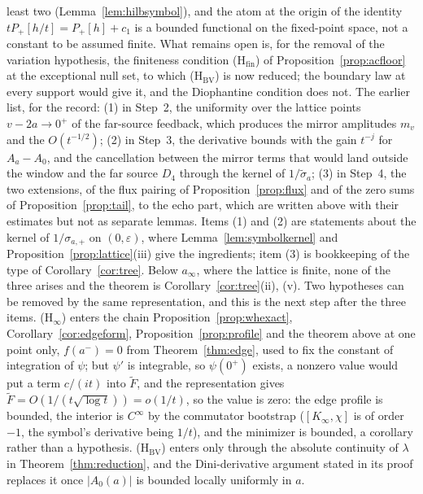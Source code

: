 \documentclass[11pt]{article}
\theoremstyle{definition}
\theoremstyle{remark}
\begin{document}
least two (Lemma~\ref{lem:hilbsymbol}), and the atom at the origin of the identity $tP_+[h/t]=P_+[h]+c_1$ is a bounded functional on the fixed-point space, not a constant to be assumed finite. What remains open is, for the removal of the variation hypothesis, the finiteness condition (H$_{\mathrm{fin}}$) of Proposition~\ref{prop:acfloor} at the exceptional null set, to which (H$_{\mathrm{BV}}$) is now reduced; the boundary law at every support would give it, and the Diophantine condition does not. The earlier list, for the record: (1) in Step~2, the uniformity over the lattice points $v-2a\to0^+$ of the far-source feedback, which produces the mirror amplitudes $m_v$ and the $O(t^{-1/2})$; (2) in Step~3, the derivative bounds with the gain $t^{-j}$ for $A_a-A_0$, and the cancellation between the mirror terms that would land outside the window and the far source $D_4$ through the kernel of $1/\tilde\sigma_a$; (3) in Step~4, the two extensions, of the flux pairing of Proposition~\ref{prop:flux} and of the zero sums of Proposition~\ref{prop:tail}, to the echo part, which are written above with their estimates but not as separate lemmas. Items (1) and (2) are statements about the kernel of $1/\sigma_{a,+}$ on $(0,\varepsilon)$, where Lemma~\ref{lem:symbolkernel} and Proposition~\ref{prop:lattice}(iii) give the ingredients; item (3) is bookkeeping of the type of Corollary~\ref{cor:tree}. Below $a_\infty$, where the lattice is finite, none of the three arises and the theorem is Corollary~\ref{cor:tree}(ii), (v). Two hypotheses can be removed by the same representation, and this is the next step after the three items. (H$_\infty$) enters the chain Proposition~\ref{prop:whexact}, Corollary~\ref{cor:edgeform}, Proposition~\ref{prop:profile} and the theorem above at one point only, $f(a^-)=0$ from Theorem~\ref{thm:edge}, used to fix the constant of integration of $\psi$; but $\psi'$ is integrable, so $\psi(0^+)$ exists, a nonzero value would put a term $c/(it)$ into $\tilde F$, and the representation gives $\tilde F=O(1/(t\sqrt{\log t}))=o(1/t)$, so the value is zero: the edge profile is bounded, the interior is $C^\infty$ by the commutator bootstrap ($[K_\infty,\chi]$ is of order $-1$, the symbol's derivative being $1/t$), and the minimizer is bounded, a corollary rather than a hypothesis. (H$_{\mathrm{BV}}$) enters only through the absolute continuity of $\lambda$ in Theorem~\ref{thm:reduction}, and the Dini-derivative argument stated in its proof replaces it once $|A_0(a)|$ is bounded locally uniformly in $a$.
\end{document}
